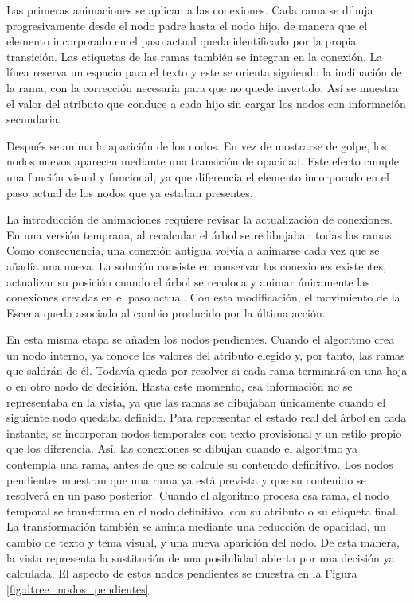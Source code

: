 Las primeras animaciones se aplican a las conexiones.
Cada rama se dibuja progresivamente desde el \gls{nodo} padre hasta el \gls{nodo} hijo, de manera que el elemento incorporado en el paso actual queda identificado por la propia transición.
Las etiquetas de las ramas también se integran en la conexión.
La línea reserva un espacio para el texto y este se orienta siguiendo la inclinación de la rama, con la corrección necesaria para que no quede invertido.
Así se muestra el valor del atributo que conduce a cada hijo sin cargar los \gls{nodo}s con información secundaria.

Después se anima la aparición de los \gls{nodo}s.
En vez de mostrarse de golpe, los \gls{nodo}s nuevos aparecen mediante una transición de opacidad.
Este efecto cumple una función visual y funcional, ya que diferencia el elemento incorporado en el paso actual de los \gls{nodo}s que ya estaban presentes.

La introducción de animaciones requiere revisar la actualización de conexiones.
En una versión temprana, al recalcular el árbol se redibujaban todas las ramas.
Como consecuencia, una conexión antigua volvía a animarse cada vez que se añadía una nueva.
La solución consiste en conservar las conexiones existentes, actualizar su posición cuando el árbol se recoloca y animar únicamente las conexiones creadas en el paso actual.
Con esta modificación, el movimiento de la \gls{Escena} queda asociado al cambio producido por la última acción.

En esta misma etapa se añaden los \gls{nodo}s pendientes.
Cuando el algoritmo crea un \gls{nodo} interno, ya conoce los valores del atributo elegido y, por tanto, las ramas que saldrán de él.
Todavía queda por resolver si cada rama terminará en una hoja o en otro \gls{nodo} de decisión.
Hasta este momento, esa información no se representaba en la vista, ya que las ramas se dibujaban únicamente cuando el siguiente \gls{nodo} quedaba definido.
Para representar el estado real del árbol en cada instante, se incorporan \gls{nodo}s temporales con texto provisional y un estilo propio que los diferencia.
Así, las conexiones se dibujan cuando el algoritmo ya contempla una rama, antes de que se calcule su contenido definitivo.
Los \gls{nodo}s pendientes muestran que una rama ya está prevista y que su contenido se resolverá en un paso posterior.
Cuando el algoritmo procesa esa rama, el \gls{nodo} temporal se transforma en el \gls{nodo} definitivo, con su atributo o su etiqueta final.
La transformación también se anima mediante una reducción de opacidad, un cambio de texto y tema visual, y una nueva aparición del \gls{nodo}.
De esta manera, la vista representa la sustitución de una posibilidad abierta por una decisión ya calculada.
El aspecto de estos \gls{nodo}s pendientes se muestra en la Figura \ref{fig:dtree_nodos_pendientes}.

